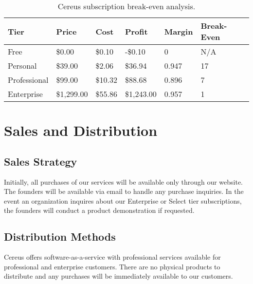 \begin{table}[H]
  \caption{Cereus subscription break-even analysis.}
  \centering
  \begin{tabularx}{\textwidth}{|X|X|X|X|X|X|}
    Tier & Price & Cost & Profit & Margin & Break-Even \\
  
    \hline
  
    Free & \$0.00 & \$0.10 & -\$0.10 & 0 & N/A \\

    \hline
  
    Personal & \$39.00 & \$2.06 & \$36.94 & 0.947 & 17 \\ 

    \hline
  
    Professional & \$99.00 & \$10.32 & \$88.68 & 0.896 & 7 \\ 

    \hline

    Enterprise & \$1,299.00 & \$55.86 & \$1,243.00 & 0.957 & 1 \\ 

  \end{tabularx}
  \label{table.cereus.breakeven}
\end{table}


\section{Sales and Distribution}

\subsection{Sales Strategy}

Initially, all purchases of our services will be available only through our website. The founders will be available via email to handle any purchase inquiries. In the event an organization inquires about our Enterprise or Select tier subscriptions, the founders will conduct a product demonstration if requested.

\subsection{Distribution Methods}

Cereus offers software-as-a-service with professional services available for professional and enterprise customers. There are no physical products to distribute and any purchases will be immediately available to our customers.

